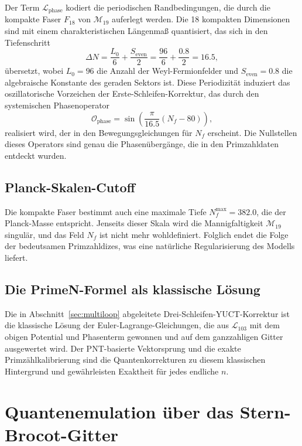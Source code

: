 \documentclass[11pt,a4paper]{article}
\begin{document}
	Der Term \(\mathcal{L}_{\text{phase}}\) kodiert die periodischen Randbedingungen, die durch die kompakte Faser \(F_{18}\) von \(\mathcal{M}_{19}\) auferlegt werden. Die 18 kompakten Dimensionen sind mit einem charakteristischen Längenmaß quantisiert, das sich in den Tiefenschritt
	\[
	\Delta N = \frac{L_0}{6} + \frac{S_{\mathrm{even}}}{2}
	= \frac{96}{6} + \frac{0.8}{2} = 16.5,
	\]
	übersetzt, wobei \(L_0=96\) die Anzahl der Weyl-Fermionfelder und \(S_{\mathrm{even}}=0.8\) die algebraische Konstante des geraden Sektors ist. Diese Periodizität induziert das oszillatorische Vorzeichen der Erste-Schleifen-Korrektur, das durch den systemischen Phasenoperator
	\[
	\mathcal{O}_{\text{phase}} = \sin\!\left(\frac{\pi}{16.5}(N_f-80)\right),
	\]
	realisiert wird, der in den Bewegungsgleichungen für \(N_f\) erscheint. Die Nullstellen dieses Operators sind genau die Phasenübergänge, die in den Primzahldaten entdeckt wurden.
	
	\subsection{Planck-Skalen-Cutoff}
	
	Die kompakte Faser bestimmt auch eine maximale Tiefe \(N_f^{\max} = 382.0\), die der Planck-Masse entspricht. Jenseits dieser Skala wird die Mannigfaltigkeit \(\mathcal{M}_{19}\) singulär, und das Feld \(N_f\) ist nicht mehr wohldefiniert. Folglich endet die Folge der bedeutsamen Primzahldizes, was eine natürliche Regularisierung des Modells liefert.
	
	\subsection{Die PrimeN-Formel als klassische Lösung}
	
	Die in Abschnitt~\ref{sec:multiloop} abgeleitete Drei-Schleifen-YUCT-Korrektur ist die klassische Lösung der Euler-Lagrange-Gleichungen, die aus \(\mathcal{L}_{103}\) mit dem obigen Potential und Phasenterm gewonnen und auf dem ganzzahligen Gitter ausgewertet wird. Der PNT-basierte Vektorsprung und die exakte Primzählkalibrierung sind die Quantenkorrekturen zu diesem klassischen Hintergrund und gewährleisten Exaktheit für jedes endliche \(n\).
	
	\section{Quantenemulation über das Stern-Brocot-Gitter}
	\label{sec:quantum-emulation}
	
\end{document}
